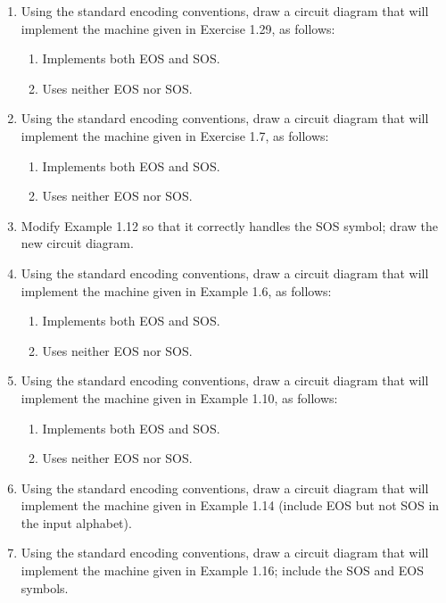 \begin{enumerate}[{1.}1.]
\item Using the standard encoding conventions, draw a circuit diagram that will
implement the machine given in Exercise 1.29, as follows:
\begin{enumerate}
\item Implements both \<EOS\> and \<SOS\>.
\item Uses neither \<EOS\> nor \<SOS\>.
\end{enumerate}

\item Using the standard encoding conventions, draw a circuit diagram that will
implement the machine given in Exercise 1.7, as follows:
\begin{enumerate}
\item Implements both \<EOS\> and \<SOS\>.
\item Uses neither \<EOS\> nor \<SOS\>.
\end{enumerate}

\item Modify Example 1.12 so that it correctly handles the \<SOS\> symbol; draw
the new circuit diagram.

\item Using the standard encoding conventions, draw a circuit diagram that will
implement the machine given in Example 1.6, as follows:
\begin{enumerate}
\item Implements both \<EOS\> and \<SOS\>.
\item Uses neither \<EOS\> nor \<SOS\>.
\end{enumerate}

\item Using the standard encoding conventions, draw a circuit diagram that will
implement the machine given in Example 1.10, as follows:
\begin{enumerate}
\item Implements both \<EOS\> and \<SOS\>.
\item Uses neither \<EOS\> nor \<SOS\>.
\end{enumerate}

\item Using the standard encoding conventions, draw a circuit diagram that will
implement the machine given in Example 1.14 (include \<EOS\> but not \<SOS\> in
the input alphabet).

\item Using the standard encoding conventions, draw a circuit diagram that will
implement the machine given in Example 1.16; include the \<SOS\> and \<EOS\>
symbols.


\end{enumerate}
